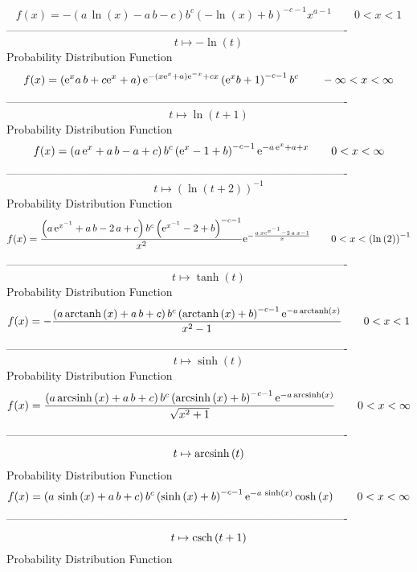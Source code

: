 \documentclass[12pt]{article}
\begin{document}
$$  f(x)=- \left( a\,\ln  \left( x \right) -a\,b-c \right) {b}^{c} \left( -\ln 
 \left( x \right) +b \right) ^{-c-1}{x}^{a-1}
 \qquad0
 < x < 1
$$-------------------------------------------------------------------------------------------  \\$$t\mapsto -\ln  \left( t \right) 
$$Probability Distribution Function 
$$  f(x)= \left( {{\rm e}^{x}}a\,b+c{{\rm e}^{x}}+a \right) {{\rm e}^{- \left( 
x{{\rm e}^{x}}+a \right) {{\rm e}^{-x}}+cx}} \left( {{\rm e}^{x}}b+1
 \right) ^{-c-1}{b}^{c}
 \qquad-\infty 
 < x < \infty 
$$-------------------------------------------------------------------------------------------  \\$$t\mapsto \ln  \left( t+1 \right) 
$$Probability Distribution Function 
$$  f(x)= \left( a\,{{\rm e}^{x}}+a\,b-a+c \right) {b}^{c} \left( {{\rm e}^{x}}
-1+b \right) ^{-c-1}{{\rm e}^{-a\,{{\rm e}^{x}}+a+x}}
 \qquad0
 < x < \infty 
$$-------------------------------------------------------------------------------------------  \\$$t\mapsto  \left( \ln  \left( t+2 \right)  \right) ^{-1}
$$Probability Distribution Function 
$$  f(x)={\frac { \left( a\,{{\rm e}^{{x}^{-1}}}+a\,b-2\,a+c \right) {b}^{c}
 \left( {{\rm e}^{{x}^{-1}}}-2+b \right) ^{-c-1}}{{x}^{2}}{{\rm e}^{-{
\frac {a\,x{{\rm e}^{{x}^{-1}}}-2\,a\,x-1}{x}}}}}
 \qquad0
 < x <  \left( \ln  \left( 2 \right)  \right) ^{-1}
$$-------------------------------------------------------------------------------------------  \\$$t\mapsto \tanh \left( t \right) 
$$Probability Distribution Function 
$$  f(x)=-{\frac { \left( a\,{\rm arctanh} \left(x\right)+a\,b+c \right) {b}^{c
} \left( {\rm arctanh} \left(x\right)+b \right) ^{-c-1}{{\rm e}^{-a\,
{\rm arctanh} \left(x\right)}}}{{x}^{2}-1}}
 \qquad0
 < x < 1
$$-------------------------------------------------------------------------------------------  \\$$t\mapsto \sinh \left( t \right) 
$$Probability Distribution Function 
$$  f(x)={\frac { \left( a\,{\rm arcsinh} \left(x\right)+a\,b+c \right) {b}^{c}
 \left( {\rm arcsinh} \left(x\right)+b \right) ^{-c-1}{{\rm e}^{-a\,
{\rm arcsinh} \left(x\right)}}}{\sqrt {{x}^{2}+1}}}
 \qquad0
 < x < \infty 
$$-------------------------------------------------------------------------------------------  \\$$t\mapsto {\rm arcsinh} \left(t\right)
$$Probability Distribution Function 
$$  f(x)= \left( a\,\sinh \left( x \right) +a\,b+c \right) {b}^{c} \left( \sinh
 \left( x \right) +b \right) ^{-c-1}{{\rm e}^{-a\,\sinh \left( x
 \right) }}\cosh \left( x \right) 
 \qquad0
 < x < \infty 
$$-------------------------------------------------------------------------------------------  \\$$t\mapsto {\rm csch} \left(t+1\right)
$$Probability Distribution Function 
\end{document}
